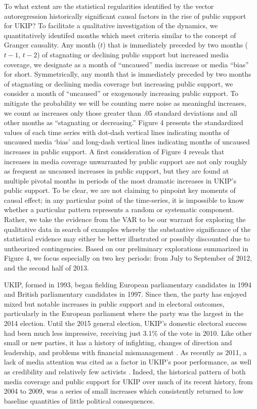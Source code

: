 \documentclass[12pt,]{article}
\begin{document}
To what extent are the statistical regularities identified by the vector
autoregression historically significant causal factors in the rise of
public support for UKIP? To facilitate a qualitative investigation of
the dynamics, we quantitatively identifed months which meet criteria
similar to the concept of Granger causality. Any month (\(t\)) that is
immediately preceded by two months (\(t-1\), \(t-2\)) of stagnating or
declining public support but increased media coverage, we designate as a
month of ``uncaused'' media increase or media ``bias'' for short.
Symmetrically, any month that is immediately preceded by two months of
stagnating or declining media coverage but increasing public support, we
consider a month of ``uncaused'' or exogenously increasing public
support. To mitigate the probability we will be counting mere noise as
meaningful increases, we count as increases only those greater than .05
standard deviations and all other months as ``stagnating or
decreasing.'' Figure 4 presents the standardized values of each time
series with dot-dash vertical lines indicating months of uncaused media
`bias' and long-dash vertical lines indicating months of uncaused
increases in public support. A first consideration of Figure 4 reveals
that increases in media coverage unwarranted by public support are not
only roughly as frequent as uncaused increases in public support, but
they are found at multiple pivotal months in periods of the most
dramatic increases in UKIP's public support. To be clear, we are not
claiming to pinpoint key moments of causal effect; in any particular
point of the time-series, it is impossible to know whether a particular
pattern represents a random or systematic component. Rather, we take the
evidence from the VAR to be our warrant for exploring the qualitative
data in search of examples whereby the substantive significance of the
statistical evidence may either be better illustrated or possibly
discounted due to untheorized contingencies. Based on our preliminary
explorations summarized in Figure 4, we focus especially on two key
periods: from July to September of 2012, and the second half of 2013.

UKIP, formed in 1993, began fielding European parliamentary candidates
in 1994 and British parliamentary candidates in 1997. Since then, the
party has enjoyed mixed but notable increases in public support and in
electoral outcomes, particularly in the European parliament where the
party was the largest in the 2014 election. Until the 2015 general
election, UKIP's domestic electoral success had been much less
impressive, receiving just 3.1\% of the vote in 2010. Like other small
or new parties, it has a history of infighting, changes of direction and
leadership, and problems with financial mismanagement
\citep{Whitaker:2011gi}. As recently as 2011, a lack of media attention
was cited as a factor in UKIP's poor performance, as well as credibility
and relatively few activists \citep{ford_strategic_2012}. Indeed, the
historical pattern of both media coverage and public support for UKIP
over much of its recent history, from 2004 to 2009, was a series of
small increases which consistently returned to low baseline quantities
of little political consequences.
\end{document}

